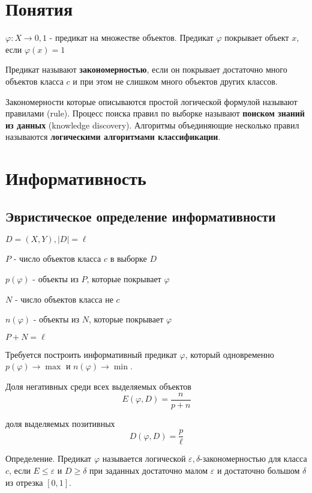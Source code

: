 


    
    \section{Понятия}

    $\varphi : X \rightarrow {0, 1}$ - предикат на множестве объектов.
    Предикат $\varphi$ покрывает объект $x$, если $\varphi(x) = 1$

    Предикат называют \textbf{закономерностью}, если он покрывает достаточно
    много объектов класса $c$ и при этом не слишком много объектов других классов.

    Закономерности которые описываются простой логической формулой называют
    правилами (rule). Процесс поиска правил по выборке называют 
    \textbf{поиском знаний из данных} (knowledge discovery).
    Алгоритмы объединяющие несколько правил называются \textbf{логическими
    алгоритмами классификации}.
    
    \section{Информативность}

    \subsection{Эвристическое определение информативности}

    $D = (X, Y), |D| = \ell$

    $P$ - число объектов класса $c$ в выборке $D$

    $p(\varphi)$ - объекты из $P$, которые покрывает $\varphi$

    $N$ - число объектов класса не $c$

    $n(\varphi)$ - объекты из $N$, которые покрывает $\varphi$

    $P + N = \ell$

    Требуется построить информативный предикат $\varphi$, который одновременно
    $p(\varphi) \rightarrow \max$ и $n(\varphi) \rightarrow \min$.

    Доля негативных среди всех выделяемых объектов
    \[
    E(\varphi, D) = \frac{n}{p + n}
    \]

    доля выделяемых позитивных
    \[
        D(\varphi, D) = \frac{p}{\ell}
    \]

    Определение.
    Предикат $\varphi$ называется логической $\varepsilon, \delta$-закономерностью
    для класса $c$, если $E \le \varepsilon$ и $D \ge \delta$ при заданных достаточно
    малом $\varepsilon$ и достаточно большом $\delta$ из отрезка $[0, 1]$.

